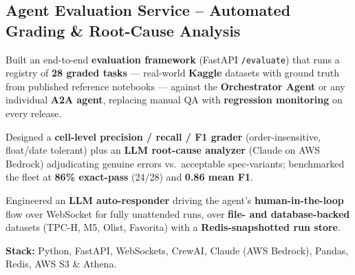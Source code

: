 \documentclass[letter,10pt]{article}
\begin{document}
\subsection{Agent Evaluation Service -- Automated Grading \& Root-Cause Analysis}
\begin{zitemize}
\item Built an end-to-end \textbf{evaluation framework} (FastAPI \texttt{/evaluate}) that runs a registry of \textbf{28 graded tasks} --- real-world \textbf{Kaggle} datasets with ground truth from published reference notebooks --- against the \textbf{Orchestrator Agent} or any individual \textbf{A2A agent}, replacing manual QA with \textbf{regression monitoring} on every release.
\item Designed a \textbf{cell-level precision / recall / F1 grader} (order-insensitive, float/date tolerant) plus an \textbf{LLM root-cause analyzer} (Claude on AWS Bedrock) adjudicating genuine errors vs.\ acceptable spec-variants; benchmarked the fleet at \textbf{86\% exact-pass} (24/28) and \textbf{0.86 mean F1}.
\item Engineered an \textbf{LLM auto-responder} driving the agent's \textbf{human-in-the-loop} flow over WebSocket for fully unattended runs, over \textbf{file- and database-backed} datasets (TPC-H, M5, Olist, Favorita) with a \textbf{Redis-snapshotted run store}.
\item \textbf{Stack:} Python, FastAPI, WebSockets, CrewAI, Claude (AWS Bedrock), Pandas, Redis, AWS S3 \& Athena.
\end{zitemize}

\end{document}
